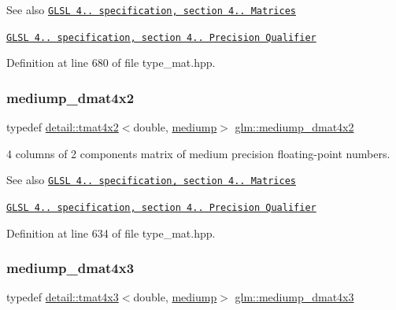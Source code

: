 \begin{DoxySeeAlso}{See also}
\href{http://www.opengl.org/registry/doc/GLSLangSpec.4.20.8.pdf}{\tt G\+L\+SL 4.. specification, section 4.. Matrices} 

\href{http://www.opengl.org/registry/doc/GLSLangSpec.4.20.8.pdf}{\tt G\+L\+SL 4.. specification, section 4.. Precision Qualifier} 
\end{DoxySeeAlso}


Definition at line 680 of file type\+\_\+mat.\+hpp.

\mbox{\label{group__core__precision_ga03056b616496470371473cd5df4dc1f8}} 
\subsubsection{\texorpdfstring{mediump\+\_\+dmat4x2}{mediump\_dmat4x2}}
{\footnotesize\ttfamily typedef \hyperlink{structglm_1_1detail_1_1tmat4x2}{detail\+::tmat4x2}$<$double, \hyperlink{namespaceglm_a0f04f086094c747d227af4425893f545a6416f3ea0c9025fb21ed50c4d6620482}{mediump}$>$ \hyperlink{group__core__precision_ga03056b616496470371473cd5df4dc1f8}{glm\+::mediump\+\_\+dmat4x2}}

4 columns of 2 components matrix of medium precision floating-\/point numbers.

\begin{DoxySeeAlso}{See also}
\href{http://www.opengl.org/registry/doc/GLSLangSpec.4.20.8.pdf}{\tt G\+L\+SL 4.. specification, section 4.. Matrices} 

\href{http://www.opengl.org/registry/doc/GLSLangSpec.4.20.8.pdf}{\tt G\+L\+SL 4.. specification, section 4.. Precision Qualifier} 
\end{DoxySeeAlso}


Definition at line 634 of file type\+\_\+mat.\+hpp.

\mbox{\label{group__core__precision_gafa1ba33d2748737129cde471fedbf9c5}} 
\subsubsection{\texorpdfstring{mediump\+\_\+dmat4x3}{mediump\_dmat4x3}}
{\footnotesize\ttfamily typedef \hyperlink{structglm_1_1detail_1_1tmat4x3}{detail\+::tmat4x3}$<$double, \hyperlink{namespaceglm_a0f04f086094c747d227af4425893f545a6416f3ea0c9025fb21ed50c4d6620482}{mediump}$>$ \hyperlink{group__core__precision_gafa1ba33d2748737129cde471fedbf9c5}{glm\+::mediump\+\_\+dmat4x3}}


